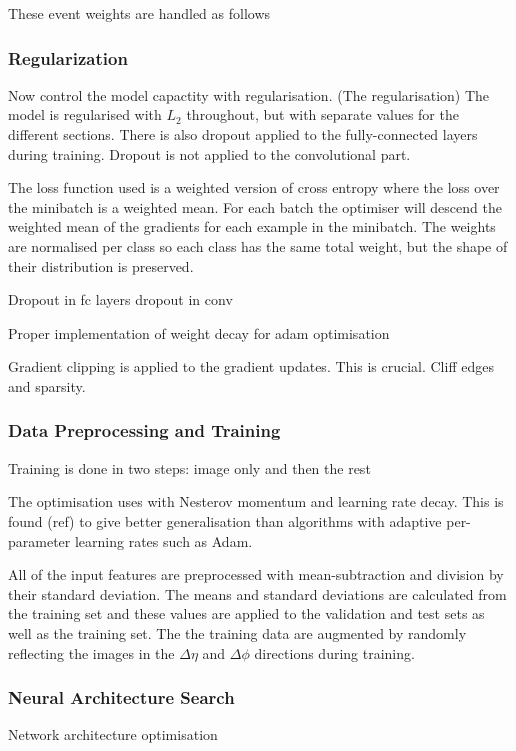 These event weights are handled as follows


\subsubsection{Regularization}
Now control the model capactity with regularisation. 
(The regularisation)
The model is regularised with $L_2$ throughout, but with separate values for the different sections. There is also dropout applied to the fully-connected layers during training. 
Dropout is not applied to the convolutional part. 

The loss function used is a weighted version of cross entropy where the loss over the minibatch is a weighted mean. For each batch the optimiser will descend the weighted mean of the gradients for each example in the minibatch. The weights are normalised per class so each class has the same total weight, but the shape of their distribution is preserved.  



Dropout in fc layers dropout in conv

Proper implementation of weight decay for adam optimisation

Gradient clipping is applied to the gradient updates. This is crucial. Cliff edges and sparsity.



\subsubsection{Data Preprocessing and Training}

Training is done in two steps: image only and then the rest

The optimisation uses  with Nesterov momentum and learning rate decay. This is found (ref) to give better generalisation than algorithms with adaptive per-parameter learning rates such as Adam. 

All of the input features are preprocessed with mean-subtraction and division by their standard deviation. The means and standard deviations are calculated from the training set and these values are applied to the validation and test sets as well as the training set. 
The the training data are augmented by randomly reflecting the images in the $\Delta\eta$ and $\Delta\phi$ directions during training. 



\subsubsection{Neural Architecture Search}
Network architecture optimisation

